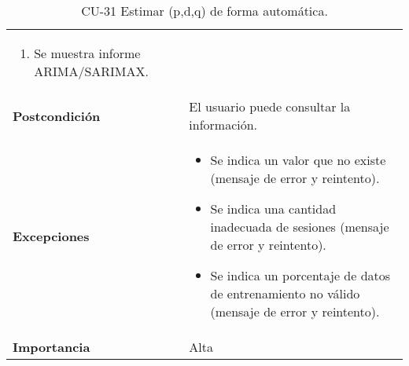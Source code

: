 \begin{table}[p]
\begin{tabularx}{\linewidth}{ p{} p{} }
\begin{enumerate}
			\item Se muestra informe ARIMA/SARIMAX.
		\end{enumerate}\\
		\textbf{Postcondición}        & El usuario puede consultar la información. \\
		\textbf{Excepciones}          & 
		\begin{itemize}
			\tightlist
			\item Se indica un valor que no existe (mensaje de error y reintento).
			\item Se indica una cantidad inadecuada de sesiones (mensaje de error y reintento).
			\item Se indica un porcentaje de datos de entrenamiento no válido (mensaje de error y reintento).
		\end{itemize} \\
		\textbf{Importancia}          & Alta \\
		\bottomrule
	\end{tabularx}
	\caption{CU-31 Estimar (p,d,q) de forma automática.}
\end{table}



